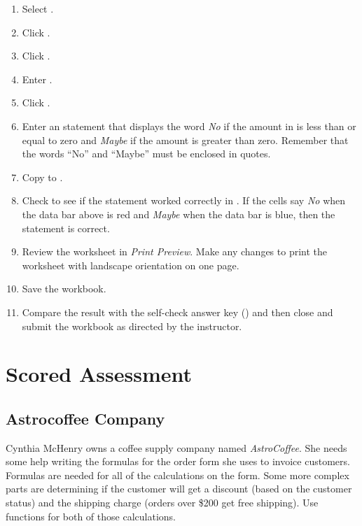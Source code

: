 \begin{enumbox}
\begin{enumerate}
		\item Select . 
		\item Click .
		
		\item Click . 
		\item Enter . 
		\item Click .
		\item Enter an  statement that displays the word \textit{No} if the amount in  is less than or equal to zero and \textit{Maybe} if the amount is greater than zero. Remember that the words ``No'' and ``Maybe'' must be enclosed in quotes. 
		\item Copy  to .
	
		\item Check to see if the  statement worked correctly in . If the cells say \textit{No} when the data bar above is red and \textit{Maybe} when the data bar is blue, then the  statement is correct.
	
		\item Review the worksheet in \textit{Print Preview}. Make any changes to print the worksheet with landscape orientation on one page.
		\item Save the  workbook.
		\item Compare the result with the self-check answer key () and then close and submit the  workbook as directed by the instructor.
	\end{enumerate}
\end{enumbox}
	
\section{Scored Assessment}

\subsection{Astrocoffee Company}

Cynthia McHenry owns a coffee supply company named \textit{AstroCoffee}. She needs some help writing the formulas for the order form she uses to invoice customers. Formulas are needed for all of the calculations on the form. Some more complex parts are determining if the customer will get a discount (based on the customer status) and the shipping charge (orders over \$200 get free shipping). Use  functions for both of those calculations.

